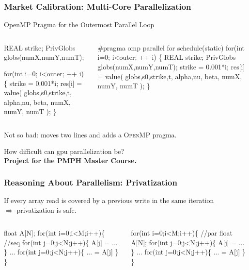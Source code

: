 \documentclass{beamer}
\newcommand{\emp}[1]{\textcolor{DikuRed}{ #1}}
\newcommand{\emphh}[1]{\textcolor{CosGreen}{ #1}}
\begin{document}
\begin{frame}[fragile,t]
\frametitle{Market Calibration: Multi-Core Parallelization}


\begin{block}{OpenMP Pragma for the Outermost Parallel Loop}
\begin{columns}
\begin{colorcode}
\emp{REAL strike;}
\emp{PrivGlobs globs(numX,numY,numT);}

\emp{for(int i=0; i<outer; ++ i)} \{
  strike = 0.001*i;
  res[i] = value( globs,s0,strike,t,
                  alpha,nu,   beta,
                  numX, numY, numT );
\}
\end{colorcode}
\begin{colorcode}
\emphh{\#pragma omp parallel for schedule(static)}
for(int i=0; i<outer; ++ i) \{
  \emphh{REAL strike;}
  \emphh{PrivGlobs globs(numX,numY,numT);}
  strike = 0.001*i;
  res[i] = value( globs,s0,strike,t,
                  alpha,nu,    beta,
                  numX, numY,  numT );
\}
\end{colorcode}
\end{columns}
\end{block} 
\bigskip

Not so bad: moves two lines and adds a \textsc{OpenMP} pragma.\bigskip

How difficult can {\sc gpu} parallelization be?\\
\emp{\bf Project for the PMPH Master Course.}

\end{frame}



\begin{frame}[fragile,t]
  \frametitle{Reasoning About Parallelism: Privatization} %

If every array read is covered by a previous write in the same iteration\\
$\Rightarrow$ privatization is safe.\bigskip

\begin{columns}
\begin{colorcode}
\emp{float A[N];}
\emp{for(int i=0;i<M;i++)\{ //seq}
  for(int j=0;j<N;j++)\{
    A[j] = ...
  \}
  ...
  for(int j=0;j<N;j++)\{
    ... = A[j]
  \}  
\}
\end{colorcode}
\begin{colorcode}
\emphh{for(int i=0;i<M;i++)\{ //par}
  \emphh{float A[N];}
  for(int j=0;j<N;j++)\{
    A[j] = ...
  \}
  ...
  for(int j=0;j<N;j++)\{
    ... = A[j]
  \}  
\}
\end{colorcode}
\end{columns}

\end{frame}
\end{document}
